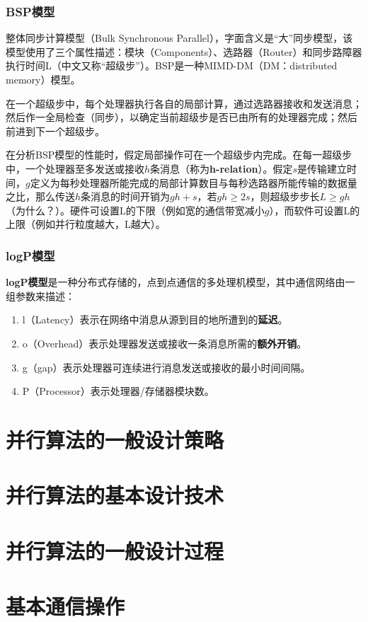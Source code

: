 \documentclass{article}
\begin{document}
			\subsubsection{BSP模型}
				整体同步计算模型（Bulk Synchronous Parallel），字面含义是``大''同步模型，该模型使用了三个属性描述：模块（Components）、选路器（Router）和同步路障器执行时间L（中文又称“超级步”）。BSP是一种MIMD-DM（DM：distributed memory）模型。
				
				在一个超级步中，每个处理器执行各自的局部计算，通过选路器接收和发送消息；然后作一全局检查（同步），以确定当前超级步是否已由所有的处理器完成；然后前进到下一个超级步。
				
				在分析BSP模型的性能时，假定局部操作可在一个超级步内完成。在每一超级步中，一个处理器至多发送或接收$h$条消息（称为\textbf{h-relation}）。假定$s$是传输建立时间，$g$定义为每秒处理器所能完成的局部计算数目与每秒选路器所能传输的数据量之比，那么传送$h$条消息的时间开销为$gh+s$，若$gh\geq 2s$，则超级步步长$L\geq gh$（为什么？）。硬件可设置L的下限（例如宽的通信带宽减小$g$），而软件可设置L的上限（例如并行粒度越大，L越大）。
			\subsubsection{logP模型}
				\textbf{logP模型}是一种分布式存储的，点到点通信的多处理机模型，其中通信网络由一组参数来描述：
				\begin{enumerate}
					\item l（Latency）表示在网络中消息从源到目的地所遭到的\textbf{延迟}。
					\item o（Overhead）表示处理器发送或接收一条消息所需的\textbf{额外开销}。
					\item g（gap）表示处理器可连续进行消息发送或接收的最小时间间隔。
					\item P（Processor）表示处理器/存储器模块数。
				\end{enumerate}
		\section{并行算法的一般设计策略}
		\section{并行算法的基本设计技术}
		\section{并行算法的一般设计过程}
		\section{基本通信操作}
\end{document}
